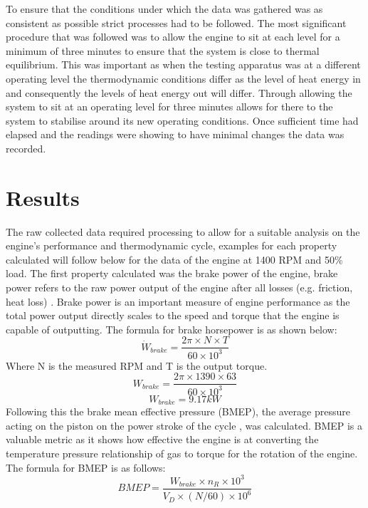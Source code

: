 \documentclass[12pt]{article}
\begin{document}
To ensure that the conditions under which the data was gathered was as consistent as possible strict processes had to be followed. The most significant procedure that was followed was to allow the engine to sit at each level for a minimum of three minutes to ensure that the system is close to thermal equilibrium. This was important as when the testing apparatus was at a different operating level the thermodynamic conditions differ as the level of heat energy in and consequently the levels of heat energy out will differ. Through allowing the system to sit at an operating level for three minutes allows for there to the system to stabilise around its new operating conditions. Once sufficient time had elapsed and the readings were showing to have minimal changes the data was recorded.
\pagebreak
\section{Results}
The raw collected data required processing to allow for a suitable analysis on the engine's performance and thermodynamic cycle, examples for each property calculated will follow below for the data of the engine at 1400 RPM and 50\% load. The first property calculated was the brake power of the engine, brake power refers to the raw power output of the engine after all losses (e.g. friction, heat loss) \cite{COKER}. Brake power is an important measure of engine performance as the total power output directly scales to the speed and torque that the engine is capable of outputting. The formula for brake horsepower is as shown below:
\begin{equation}
\dot{W}_{brake} = \frac{2\pi \times N \times T}{60\times10^3}
\end{equation}
Where N is the measured RPM and T is the output torque.
\begin{equation*}
    W_{brake} = \frac{2\pi\times 1390\times 63}{60\times 10^3}
\end{equation*}
\begin{equation*}
    W_{brake} = 9.17 kW
\end{equation*}
Following this the brake mean effective pressure (BMEP), the average pressure acting on the piston on the power stroke of the cycle \cite{Ibrahim}, was calculated. BMEP is a valuable metric as it shows how effective the engine is at converting the temperature pressure relationship of gas to torque for the rotation of the engine. The formula for BMEP is as follows:
\begin{equation}
    BMEP = \frac{W_{brake}\times n_R \times 10^3}{V_D \times (N/60)\times 10^6}
\end{equation}
\end{document}
